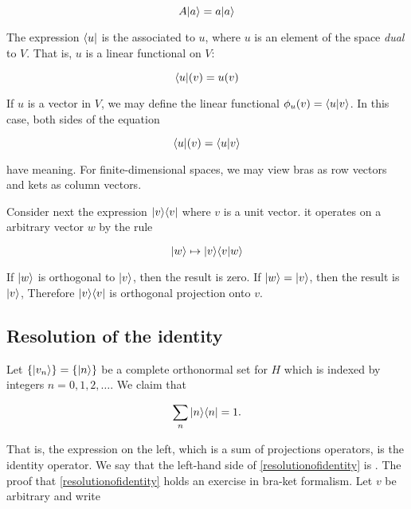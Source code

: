 \begin{equation}
A|a\rangle = a|a\rangle
\end{equation}

The expression $\langle u |$ is the  associated to $u$, where $u$ is an element of the space \emph{dual} to $V$.  That is, $u$ is a linear functional on $V$:

\begin{equation}
\langle u |(v) = u(v)
\end{equation}

If $u$ is a vector in $V$, we may define the linear functional $\phi_u(v) = \langle u | v \rangle$.  In this case, both sides of the equation

\begin{equation}
\langle u |(v) = \langle u | v \rangle
\end{equation}

have meaning.  For finite-dimensional spaces, we may view bras as row vectors and kets as column vectors.

Consider next the expression $| v \rangle \langle v |$ where $v$ is a unit vector. it operates on a arbitrary vector $w$ by the rule

\begin{equation}
  | w \rangle \mapsto | v \rangle \langle v | w \rangle
\end{equation}

If $| w \rangle$ is orthogonal to $| v \rangle$, then the result is zero.  If $| w \rangle = | v \rangle$, then the result is $| v \rangle$, Therefore $| v \rangle \langle v |$ is orthogonal projection onto $v$.


\subsection{Resolution of the identity}

Let $\{ |v_n\rangle\} = \{ |n\rangle\}$ be a complete orthonormal set for $H$ which is indexed by integers $n = 0, 1, 2, \ldots$.  We claim that

\begin{equation}
\label{resolutionofidentity}
\sum_n | n \rangle \langle n | = 1.
\end{equation}

That is, the expression on the left, which is a sum of projections operators, is the identity operator.  We say that the left-hand side of \eqref{resolutionofidentity} is  .  The proof that  \eqref{resolutionofidentity} holds an exercise in bra-ket formalism. Let $v$ be arbitrary and write

